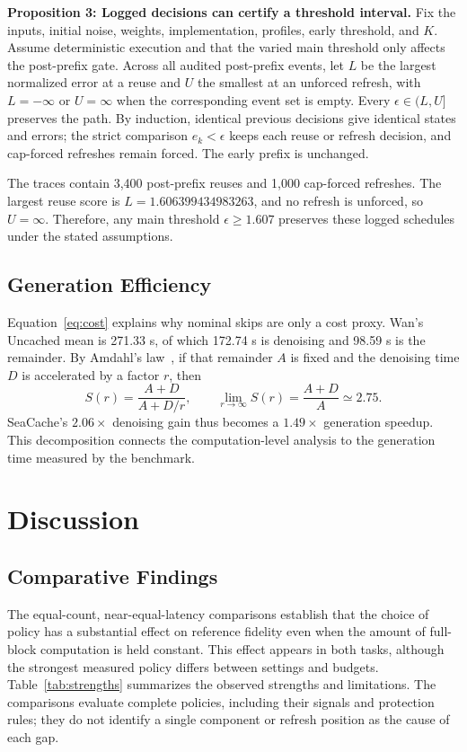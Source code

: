 \documentclass[10pt,twocolumn,letterpaper]{article}
\begin{document}
\textbf{Proposition 3: Logged decisions can certify a threshold interval.}
Fix the inputs, initial noise, weights, implementation, profiles, early threshold, and $K$.
Assume deterministic execution and that the varied main threshold only affects the post-prefix gate.
Across all audited post-prefix events, let $L$ be the largest normalized error at a reuse and $U$ the smallest at an unforced refresh, with $L=-\infty$ or $U=\infty$ when the corresponding event set is empty.
Every $\epsilon\in(L,U]$ preserves the path.
By induction, identical previous decisions give identical states and errors; the strict comparison $e_k<\epsilon$ keeps each reuse or refresh decision, and cap-forced refreshes remain forced.
The early prefix is unchanged.

The traces contain 3,400 post-prefix reuses and 1,000 cap-forced refreshes.
The largest reuse score is $L=1.606399434983263$, and no refresh is unforced, so $U=\infty$.
Therefore, any main threshold $\epsilon\ge1.607$ preserves these logged schedules under the stated assumptions.

\subsection{Generation Efficiency}
Equation~\ref{eq:cost} explains why nominal skips are only a cost proxy.
Wan's Uncached mean is 271.33 s, of which 172.74 s is denoising and 98.59 s is the remainder.
By Amdahl's law~\cite{amdahl1967validity}, if that remainder $A$ is fixed and the denoising time $D$ is accelerated by a factor $r$, then
\begin{equation}
 S(r)=\frac{A+D}{A+D/r},\qquad
 \lim_{r\rightarrow\infty}S(r)=\frac{A+D}{A}\simeq2.75.
\end{equation}
SeaCache's $2.06\times$ denoising gain thus becomes a $1.49\times$ generation speedup.
This decomposition connects the computation-level analysis to the generation time measured by the benchmark.

\section{Discussion}
\label{sec:discussion}
\subsection{Comparative Findings}
The equal-count, near-equal-latency comparisons establish that the choice of policy has a substantial effect on reference fidelity even when the amount of full-block computation is held constant.
This effect appears in both tasks, although the strongest measured policy differs between settings and budgets.
Table~\ref{tab:strengths} summarizes the observed strengths and limitations.
The comparisons evaluate complete policies, including their signals and protection rules; they do not identify a single component or refresh position as the cause of each gap.
\end{document}
